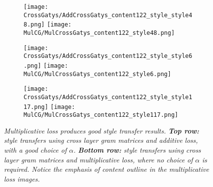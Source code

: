 \documentclass[runningheads]{llncs}
\begin{document}
\begin{figure}[!htbp]
\centering
\small 
\begin{subfigure}[t]{0.3\linewidth}
    \texttt{[image: CrossGatys/AddCrossGatys\_content122\_style\_style48.png]}
    \texttt{[image: MulCG/MulCrossGatys\_content122\_style48.png]}
\end{subfigure}
\begin{subfigure}[t]{0.3\linewidth}
    \texttt{[image: CrossGatys/AddCrossGatys\_content122\_style\_style6.png]}
    \texttt{[image: MulCG/MulCrossGatys\_content122\_style6.png]}
\end{subfigure}
\begin{subfigure}[t]{0.3\linewidth}
    \texttt{[image: CrossGatys/AddCrossGatys\_content122\_style\_style117.png]} 
    \texttt{[image: MulCG/MulCrossGatys\_content122\_style117.png]}
\end{subfigure}

\caption{\em 
 Multiplicative loss produces good style transfer results.
{\bf Top row:} style transfers using cross layer gram matrices and additive loss, with a good choice of $\alpha$. {\bf
  Bottom row:} style transfers using cross layer gram matrices and multiplicative loss, where no choice of $\alpha$ is required. Notice the emphasis of  content outline in the multiplicative loss images. 
}
  \label{fig:MulCG}
\end{figure}














\end{document}
